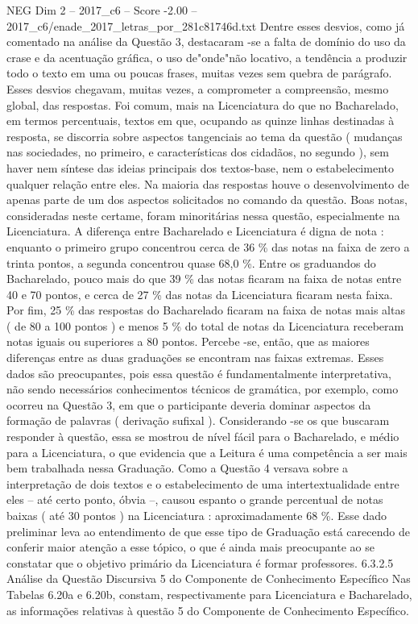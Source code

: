 \begin{textsample}{NEG Dim 2 – 2017\_c6 – Score -2.00 – 2017\_c6/enade\_2017\_letras\_por\_281c81746d.txt}
Dentre esses desvios, como já comentado na análise da Questão 3, destacaram -se a falta de domínio do uso da crase e da acentuação gráfica, o uso de"onde"não locativo, a tendência a produzir todo o texto em uma ou poucas frases, muitas vezes sem quebra de parágrafo.
Esses desvios chegavam, muitas vezes, a comprometer a compreensão, mesmo global, das respostas.
Foi comum, mais na Licenciatura do que no Bacharelado, em termos percentuais, textos em que, ocupando as quinze linhas destinadas à resposta, se discorria sobre aspectos tangenciais ao tema da questão ( mudanças nas sociedades, no primeiro, e características dos cidadãos, no segundo ), sem haver nem síntese das ideias principais dos textos-base, nem o estabelecimento qualquer relação entre eles.
Na maioria das respostas houve o desenvolvimento de apenas parte de um dos aspectos solicitados no comando da questão.
Boas notas, consideradas neste certame, foram minoritárias nessa questão, especialmente na Licenciatura.
A diferença entre Bacharelado e Licenciatura é digna de nota : enquanto o primeiro grupo concentrou cerca de 36 \% das notas na faixa de zero a trinta pontos, a segunda concentrou quase 68,0 \%.
Entre os graduandos do Bacharelado, pouco mais do que 39 \% das notas ficaram na faixa de notas entre 40 e 70 pontos, e cerca de 27 \% das notas da Licenciatura ficaram nesta faixa.
Por fim, 25 \% das respostas do Bacharelado ficaram na faixa de notas mais altas ( de 80 a 100 pontos ) e menos 5 \% do total de notas da Licenciatura receberam notas iguais ou superiores a 80 pontos.
Percebe -se, então, que as maiores diferenças entre as duas graduações se encontram nas faixas extremas.
Esses dados são preocupantes, pois essa questão é fundamentalmente interpretativa, não sendo necessários conhecimentos técnicos de gramática, por exemplo, como ocorreu na Questão 3, em que o participante deveria dominar aspectos da formação de palavras ( derivação sufixal ).
Considerando -se os que buscaram responder à questão, essa se mostrou de nível fácil para o Bacharelado, e médio para a Licenciatura, o que evidencia que a Leitura é uma competência a ser mais bem trabalhada nessa Graduação.
Como a Questão 4 versava sobre a interpretação de dois textos e o estabelecimento de uma intertextualidade entre eles – até certo ponto, óbvia –, causou espanto o grande percentual de notas baixas ( até 30 pontos ) na Licenciatura : aproximadamente 68 \%.
Esse dado preliminar leva ao entendimento de que esse tipo de Graduação está carecendo de conferir maior atenção a esse tópico, o que é ainda mais preocupante ao se constatar que o objetivo primário da Licenciatura é formar professores. 6.3.2.5 Análise da Questão Discursiva 5 do Componente de Conhecimento Específico Nas Tabelas 6.20a e 6.20b, constam, respectivamente para Licenciatura e Bacharelado, as informações relativas à questão 5 do Componente de Conhecimento Específico.

\end{textsample}
